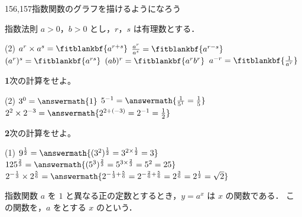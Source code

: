 \documentclass[14pt,dvipdfmx]{jsarticle}
\begin{document}
  {156,157}{指数関数のグラフを描けるようになろう}


\begin{theorembox}{指数法則}
  $a > 0$，$b > 0$ とし，$r$，$s$ は有理数とする．
  \begin{tasks}[label=\arabic*, label-format=\bfseries, label-width=1zw, item-indent=1.5zw, after-item-skip=0.5em](2)
    \task $a^r \times a^s = \fitblankbf{a^{r+s}}$
    \task $\frac{a^r}{a^s} = \fitblankbf{a^{r-s}}$
    \task $(a^r)^s = \fitblankbf{a^{rs}}$
    \task $(ab)^r = \fitblankbf{a^r b^r}$
    \task $a^{-r} = \fitblankbf{\frac{1}{a^r}}$
  \end{tasks}
\end{theorembox}

\textbf{1}\quad 次の計算をせよ。
\begin{tasks}[label=(\arabic*), label-width=1.5zw, item-indent=2zw, after-item-skip=0.8em](2)
  \task $3^0 = \answermath{1}$
  \task $5^{-1} = \answermath{\frac{1}{5^1} = \frac{1}{5}}$
  \task* $2^2 \times 2^{-3} = \answermath{2^{2+(-3)} = 2^{-1} = \frac{1}{2}}$
\end{tasks}

\textbf{2}\quad 次の計算をせよ。
\begin{tasks}[label=(\arabic*), label-width=1.5zw, item-indent=2zw, after-item-skip=1.5em](1)
  \task $9^{\frac{1}{2}} = \answermath{(3^2)^{\frac{1}{2}} = 3^{2 \times \frac{1}{2}} = 3}$
  \task $125^{\frac{2}{3}} = \answermath{(5^3)^{\frac{2}{3}} = 5^{3 \times \frac{2}{3}} = 5^2 = 25}$
  \task $2^{-\frac{1}{3}} \times 2^{\frac{5}{6}}
    = \answermath{2^{-\frac{1}{3}+\frac{5}{6}} = 2^{-\frac{2}{6}+\frac{5}{6}} = 2^{\frac{3}{6}} = 2^{\frac{1}{2}} = \sqrt{2}}$
\end{tasks}

\vfill
\nextpage

\begin{definitionbox}{指数関数}
  $a$ を $1$ と異なる正の定数とするとき，$y=a^x$ は $x$ の関数である．
  この関数を，$a$ をとする $x$ のという．
\end{definitionbox}
\vspace{0.5em}
\end{document}
